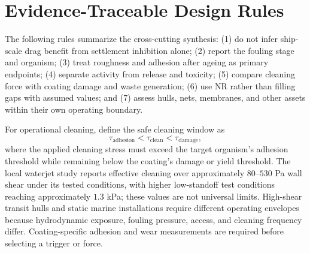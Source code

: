 \section{Evidence-Traceable Design Rules}
The following rules summarize the cross-cutting synthesis: (1) do not infer ship-scale drag benefit from settlement inhibition alone; (2) report the fouling stage and organism; (3) treat roughness and adhesion after ageing as primary endpoints; (4) separate activity from release and toxicity; (5) compare cleaning force with coating damage and waste generation; (6) use NR rather than filling gaps with assumed values; and (7) assess hulls, nets, membranes, and other assets within their own operating boundary.

For operational cleaning, define the safe cleaning window as
\begin{equation}
\tau_{\mathrm{adhesion}} < \tau_{\mathrm{clean}} < \tau_{\mathrm{damage}},
\end{equation}
where the applied cleaning stress must exceed the target organism's adhesion threshold while remaining below the coating's damage or yield threshold. The local waterjet study reports effective cleaning over approximately $80$--$530$ Pa wall shear under its tested conditions, with higher low-standoff test conditions reaching approximately $1.3$ kPa; these values are not universal limits. High-shear transit hulls and static marine installations require different operating envelopes because hydrodynamic exposure, fouling pressure, access, and cleaning frequency differ. Coating-specific adhesion and wear measurements are required before selecting a trigger or force.









